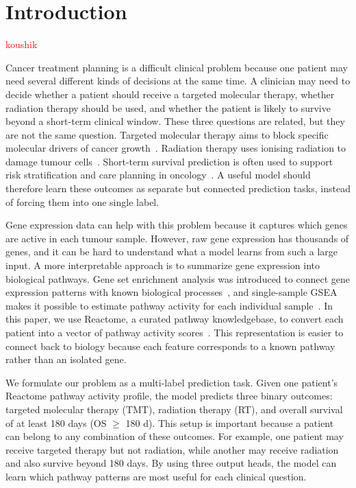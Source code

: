 \section{Introduction}
\textcolor{red}{koushik}

Cancer treatment planning is a difficult clinical problem because one
patient may need several different kinds of decisions at the same time. A
clinician may need to decide whether a patient should receive a targeted
molecular therapy, whether radiation therapy should be used, and whether
the patient is likely to survive beyond a short-term clinical window. These
three questions are related, but they are not the same question. Targeted
molecular therapy aims to block specific molecular drivers of cancer
growth~\cite{Min2022}. Radiation therapy uses ionising radiation to damage
tumour cells~\cite{Baskar2012}. Short-term survival prediction is often used
to support risk stratification and care planning in oncology~\cite{Parikh2019,
SideyGibbons2022}. A useful model should therefore learn these outcomes as
separate but connected prediction tasks, instead of forcing them into one
single label.

Gene expression data can help with this problem because it captures which
genes are active in each tumour sample. However, raw gene expression has
thousands of genes, and it can be hard to understand what a model learns
from such a large input. A more interpretable approach is to summarize gene
expression into biological pathways. Gene set enrichment analysis was
introduced to connect gene expression patterns with known biological
processes~\cite{subramanian2005gsea}, and single-sample GSEA makes it
possible to estimate pathway activity for each individual
sample~\cite{barbie2009ssgsea}. In this paper, we use Reactome, a curated
pathway knowledgebase, to convert each patient into a vector of pathway
activity scores~\cite{gillespie2022reactome}. This representation is easier
to connect back to biology because each feature corresponds to a known
pathway rather than an isolated gene.

We formulate our problem as a multi-label prediction task. Given one
patient's Reactome pathway activity profile, the model predicts three binary
outcomes: targeted molecular therapy (TMT), radiation therapy (RT), and
overall survival of at least 180 days (OS $\geq$ 180 d). This setup is
important because a patient can belong to any combination of these outcomes.
For example, one patient may receive targeted therapy but not radiation,
while another may receive radiation and also survive beyond 180 days. By
using three output heads, the model can learn which pathway patterns are
most useful for each clinical question.

